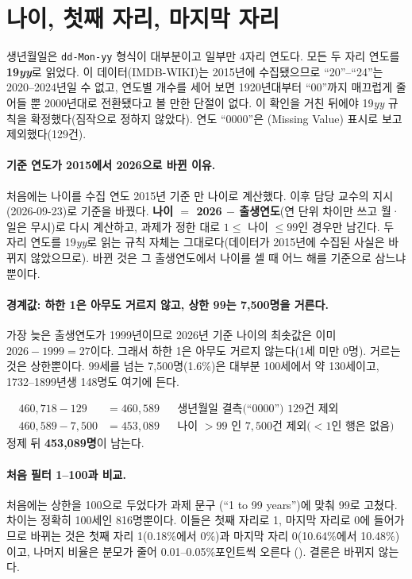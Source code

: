 \section{나이, 첫째 자리, 마지막 자리}
\label{sec:hw2-age}

\begin{pitfall}
생년월일은 \texttt{dd-Mon-yy} 형식이 대부분이고 일부만 4자리 연도다. 모든 두 자리
연도를 \textbf{19\textit{yy}}로 읽었다. 이 데이터(IMDB-WIKI)는 2015년에 수집됐으므로
``20''--``24''는 2020--2024년일 수 없고, 연도별 개수를 세어 보면 1920년대부터
``00''까지 매끄럽게 줄어들 뿐 2000년대로 전환됐다고 볼 만한 단절이 없다. 이 확인을
거친 뒤에야 19\textit{yy} 규칙을 확정했다(짐작으로 정하지 않았다). 연도 ``0000''은
(Missing Value) 표시로 보고 제외했다(129건).
\end{pitfall}

\paragraph{기준 연도가 2015에서 2026으로 바뀐 이유.} 처음에는 나이를 수집 연도
2015년 기준 만 나이로 계산했다. 이후 담당 교수의 지시(2026-09-23)로 기준을 바꿨다.
\textbf{나이 $=$ 2026 $-$ 출생연도}(연 단위 차이만 쓰고 월·일은 무시)로 다시
계산하고, 과제가 정한 대로 $1 \le$ 나이 $\le 99$인 경우만 남긴다. 두 자리 연도를 19\textit{yy}로
읽는 규칙 자체는 그대로다(데이터가 2015년에 수집된 사실은 바뀌지 않았으므로).
바뀐 것은 그 출생연도에서 나이를 셀 때 어느 해를 기준으로 삼느냐뿐이다.

\paragraph{경계값: 하한 1은 아무도 거르지 않고, 상한 99는 7{,}500명을 거른다.}
가장 늦은 출생연도가 1999년이므로 2026년 기준 나이의 최솟값은 이미 $2026-1999=27$이다.
그래서 하한 1은 아무도 거르지 않는다(1세 미만 0명). 거르는 것은 상한뿐이다. 99세를
넘는 7{,}500명(1.6\%)은 대부분 100세에서 약 130세이고, 1732--1899년생 148명도 여기에
든다.

\begin{align*}
  460{,}718 - 129 &= 460{,}589   && \text{생년월일 결측(``0000'') 129건 제외}\\
  460{,}589 - 7{,}500 &= 453{,}089  && \text{나이 } >99 \text{ 인 } 7{,}500\text{건 제외(} <1\text{인 행은 없음)}
\end{align*}
정제 뒤 \textbf{453{,}089명}이 남는다.

\paragraph{처음 필터 1--100과 비교.} 처음에는 상한을 100으로 두었다가 과제 문구
(``1 to 99 years'')에 맞춰 99로 고쳤다. 차이는 정확히 100세인 816명뿐이다. 이들은 첫째 자리로
1, 마지막 자리로 0에 들어가므로 바뀌는 것은 첫째 자리 1(0.18\%에서 0\%)과 마지막 자리
0(10.64\%에서 10.48\%)이고, 나머지 비율은 분모가 줄어 0.01--0.05\%포인트씩 오른다
(). 결론은 바뀌지 않는다.

